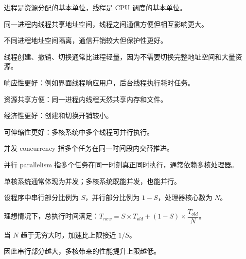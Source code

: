 \begin{points}
  \item 进程是资源分配的基本单位，线程是 CPU 调度的基本单位。
  \item 同一进程内线程共享地址空间，线程之间通信方便但相互影响更大。
  \item 不同进程地址空间隔离，通信开销较大但保护性更好。
  \item 线程创建、撤销、切换通常比进程轻量，因为不需要切换完整地址空间和大量资源。
\end{points}


\begin{points}
  \item 响应性更好：例如界面线程响应用户，后台线程执行耗时任务。
  \item 资源共享方便：同一进程内线程天然共享内存和文件。
  \item 经济性更好：创建和切换开销较小。
  \item 可伸缩性更好：多核系统中多个线程可并行执行。
\end{points}


\begin{points}
  \item 并发 concurrency 指多个任务在同一时间段内交替推进。
  \item 并行 parallelism 指多个任务在同一时刻真正同时执行，通常依赖多核处理器。
  \item 单核系统通常体现为并发；多核系统既能并发，也能并行。
\end{points}


\begin{points}
  \item 设程序中串行部分比例为 $S$，并行部分比例为 $1-S$，处理器核心数为 $N$。
  \item 理想情况下，总执行时间满足：$T_{new}=S\times T_{old}+(1-S)\times \dfrac{T_{old}}{N}$。
  \item 当 $N$ 趋于无穷大时，加速比上限接近 $1/S$。
  \item 因此串行部分越大，多核带来的性能提升上限越低。
\end{points}


